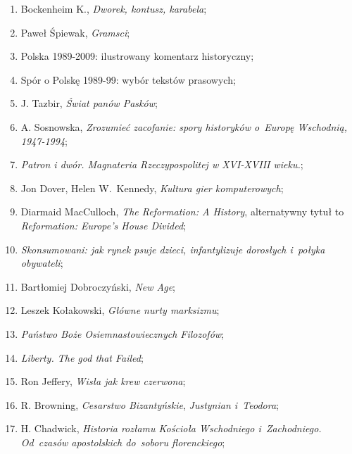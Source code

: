 \documentclass[a4paper,11pt]{article}
\begin{document}
\begin{enumerate}
\item Bockenheim K., \textit{Dworek, kontusz, karabela};

\item Paweł Śpiewak, \textit{Gramsci};

\item Polska 1989-2009: ilustrowany komentarz historyczny;

\item Spór o Polskę 1989-99: wybór tekstów prasowych;

\item J. Tazbir, \textit{Świat panów Pasków};

\item A. Sosnowska, \textit{Zrozumieć zacofanie: spory historyków
    o~Europę Wschodnią, 1947-1994};

\item \textit{Patron i dwór. Magnateria Rzeczypospolitej w XVI-XVIII
    wieku.};

\item Jon Dover, Helen W.~Kennedy, \textit{Kultura gier komputerowych};

\item Diarmaid MacCulloch, \textit{The Reformation: A History},
  alternatywny tytuł to \textit{Reformation: Europe's House Divided};

\item \textit{Skonsumowani: jak rynek psuje dzieci, infantylizuje
    dorosłych i~połyka obywateli};

\item Bartłomiej Dobroczyński, \textit{New Age};

\item Leszek Kołakowski, \textit{Główne nurty marksizmu};

\item \textit{Państwo Boże Osiemnastowiecznych Filozofów};

\item \textit{Liberty. The god that Failed};

\item Ron Jeffery, \textit{Wisła jak krew czerwona};

\item R. Browning, \textit{Cesarstwo Bizantyńskie}, \textit{Justynian
    i~Teodora};

\item H. Chadwick, \textit{Historia rozłamu Kościoła Wschodniego
    i~Zachodniego. Od~czasów apostolskich do~soboru florenckiego};


\end{enumerate}
\end{document}
